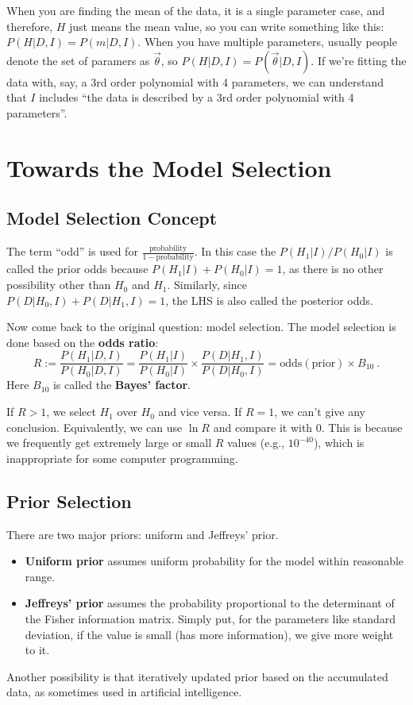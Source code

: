 When you are finding the mean of the data, it is a single parameter case, and therefore, $ H $ just means the mean value, so you can write something like this: $ P(H|D, I) = P(m|D, I) $. When you have multiple parameters, usually people denote the set of paramers as $ \vec{\theta} $, so $ P(H|D, I) = P(\vec{\theta}|D, I) $. If we're fitting the data with, say, a 3rd order polynomial with 4 parameters, we can understand that $ I $ includes ``the data is described by a 3rd order polynomial with 4 parameters''. 

\section{Towards the Model Selection}
\subsection{Model Selection Concept}
The term ``odd'' is used for $ \frac{\mathrm{probability}}{1 - \mathrm{probability}} $. In this case the $ P(H_1|I) / P(H_0|I) $ is called the prior odds because $ P(H_1|I) + P(H_0|I) = 1$, as there is no other possibility other than $ H_0 $ and $ H_1 $. Similarly, since $ P(D|H_0, I) + P(D|H_1, I) = 1$, the LHS is also called the posterior odds.

Now come back to the original question: model selection. The model selection is done based on the \textbf{odds ratio}:
\begin{equation}\label{eq: odds ratio}
  R := \frac{P(H_1 | D, I)}{P(H_0 | D, I)}
    = \frac{P(H_1|I)}{P(H_0|I)} \times \frac{P(D|H_1, I)}{P(D|H_0, I)} 
    = \mathrm{odds}(\mathrm{prior}) \times B_{10}~.
\end{equation}
Here $ B_{10} $ is called the \textbf{Bayes' factor}. 

If $ R > 1 $, we select $H_1$ over $H_0$ and vice versa. If $R=1$, we can't give any conclusion. Equivalently, we can use $\ln R $ and compare it with 0. This is because we frequently get extremely large or small $R$ values (e.g., $10^{-40}$), which is inappropriate for some computer programming.


\subsection{Prior Selection}
There are two major priors: uniform and Jeffreys' prior.
\begin{itemize}
\item \textbf{Uniform prior} assumes uniform probability for the model within reasonable range. 
\item \textbf{Jeffreys' prior} assumes the probability proportional to the determinant of the Fisher information matrix. Simply put, for the parameters like standard deviation, if the value is small (has more information), we give more weight to it.
\end{itemize}
Another possibility is that iteratively updated prior based on the accumulated data, as sometimes used in artificial intelligence.

